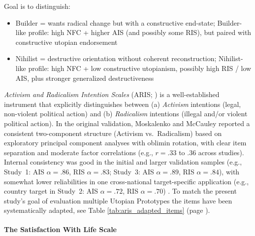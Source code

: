 \documentclass[jou,floatsintext]{apa7}
\begin{document}
Goal is to distinguish:

\begin{itemize}
    \item Builder = wants radical change but with a constructive end-state; Builder-like profile: high NFC + higher AIS (and possibly some RIS), but paired with constructive utopian endorsement
    \item Nihilist = destructive orientation without coherent reconstruction; Nihilist-like profile: high NFC + low constructive utopianism, possibly high RIS / low AIS, plus stronger generalized destructiveness
\end{itemize}

\textit{Activism and Radicalism Intention Scales} (ARIS; \cite{moskalenkoMeasuringPoliticalMobilization2009}) is a well-established instrument that explicitly distinguishes between (a) \textit{Activism} intentions (legal, non-violent political action) and (b) \textit{Radicalism} intentions (illegal and/or violent political action). In the original validation, Moskalenko and McCauley reported a consistent two-component structure (Activism vs.\ Radicalism) based on exploratory principal component analyses with oblimin rotation, with clear item separation and moderate factor correlations (e.g., $r=.33$ to $.36$ across studies). Internal consistency was good in the initial and larger validation samples (e.g., Study~1: AIS $\alpha=.86$, RIS $\alpha=.83$; Study~3: AIS $\alpha=.89$, RIS $\alpha=.84$), with somewhat lower reliabilities in one cross-national target-specific application (e.g., country target in Study~2: AIS $\alpha=.72$, RIS $\alpha=.70$) \parencite{moskalenkoMeasuringPoliticalMobilization2009}. To match the present study's goal of evaluation multiple Utopian Prototypes the items have been systematically adapted, see Table \ref{tab:aris_adapted_items} (page \pageref{tab:aris_adapted_items}). 



\paragraph{The Satisfaction With Life Scale}
\end{document}
